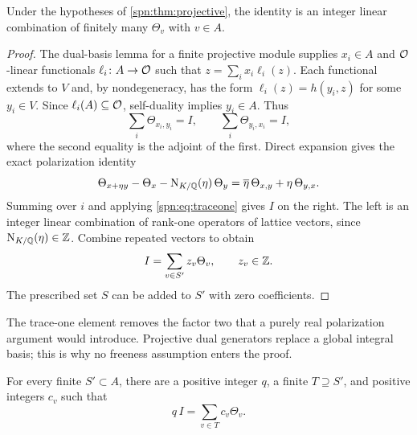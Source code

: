 \begin{lemma}\label{spn:lem:signed}
Under the hypotheses of \cref{spn:thm:projective}, the identity is an integer
linear combination of finitely many $\Theta_v$ with $v\in A$.
\end{lemma}

\begin{proof}
The dual-basis lemma for a finite projective module supplies $x_i\in A$ and
$\mathcal{O}$-linear functionals $\ell_i\colon A\to\mathcal{O}$ such that
$z=\sum_ix_i\ell_i(z)$. Each functional extends to $V$ and, by
nondegeneracy, has the form $\ell_i(z)=h(y_i,z)$ for some $y_i\in V$. Since
$\ell_i(A)\subseteq\mathcal{O}$, self-duality implies $y_i\in A$. Thus
\[
 \sum_i\Theta_{x_i,y_i}=I,\qquad\sum_i\Theta_{y_i,x_i}=I,
\]
where the second equality is the adjoint of the first. Direct expansion gives
the exact polarization identity
\begin{equation}\label{spn:eq:polarization}
 \Theta_{x+\eta y}-\Theta_x-\operatorname{N}_{K/\mathbb{Q}}(\eta)\,\Theta_y
 =\overline\eta\,\Theta_{x,y}+\eta\,\Theta_{y,x}.
\end{equation}
Summing over $i$ and applying \eqref{spn:eq:traceone} gives $I$ on the right.
The left is an integer linear combination of rank-one operators of lattice
vectors, since $\operatorname{N}_{K/\mathbb{Q}}(\eta)\in\mathbb{Z}$. Combine repeated vectors to obtain
\begin{equation}\label{spn:eq:signed-id}
 I=\sum_{v\in S'}z_v\Theta_v,\qquad z_v\in\mathbb{Z} .
\end{equation}
The prescribed set $S$ can be added to $S'$ with zero coefficients.
\end{proof}

The trace-one element removes the factor two that a purely real polarization
argument would introduce. Projective dual generators replace a global integral
basis; this is why no freeness assumption enters the proof.

\begin{lemma}\label{spn:lem:reserve}
For every finite $S'\subset A$, there are a positive integer $q$, a finite
$T\supseteq S'$, and positive integers $c_v$ such that
\begin{equation}\label{spn:eq:reserve}
 q\,I=\sum_{v\in T}c_v\Theta_v .
\end{equation}
\end{lemma}

